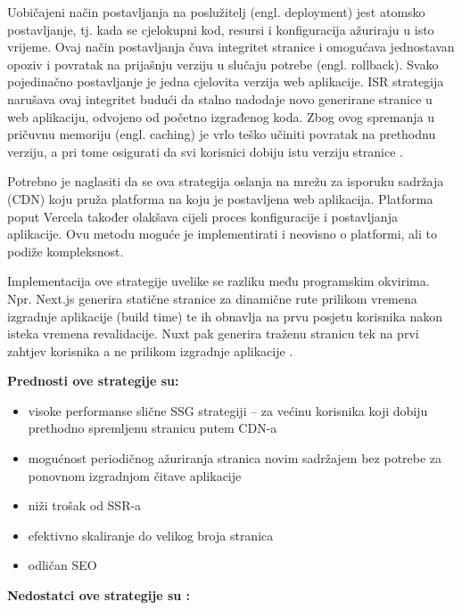 \bigskip

Uobičajeni način postavljanja na poslužitelj (engl. deployment) jest atomsko postavljanje, tj. kada se cjelokupni kod, resursi i konfiguracija ažuriraju u isto vrijeme. Ovaj način postavljanja čuva integritet stranice i omogućava jednostavan opoziv i povratak na prijašnju verziju u slučaju potrebe (engl. rollback). Svako pojedinačno postavljanje je jedna cjelovita verzija web aplikacije. ISR strategija narušava ovaj integritet budući da stalno nadodaje novo generirane stranice u web aplikaciju, odvojeno od početno izgrađenog koda. Zbog ovog spremanja u pričuvnu memoriju (engl. caching)  je vrlo teško učiniti povratak na prethodnu verziju, a pri tome osigurati da svi korisnici dobiju istu verziju stranice \cite{flaws2021isr}.

\bigskip

Potrebno je naglasiti da se ova strategija oslanja na mrežu za isporuku sadržaja (CDN) koju pruža platforma na koju je postavljena web aplikacija. Platforma poput Vercela također olakšava cijeli proces konfiguracije i postavljanja aplikacije. Ovu metodu moguće je implementirati i neovisno o platformi, ali to podiže kompleksnost.

\bigskip

Implementacija ove strategije uvelike se razliku među programskim okvirima.
Npr. Next.js generira statične stranice za dinamične rute prilikom vremena izgradnje aplikacije (build time) te ih obnavlja na prvu posjetu korisnika nakon isteka vremena revalidacije. Nuxt pak generira traženu stranicu tek na prvi zahtjev korisnika a ne prilikom izgradnje aplikacije \cite{troyan2024nuxt}.

\bigskip

\textbf{Prednosti ove strategije su:}
\begin{itemize}
    \item visoke performanse slične SSG strategiji – za većinu korisnika koji dobiju prethodno spremljenu stranicu putem CDN-a
    \item mogućnost periodičnog ažuriranja stranica novim sadržajem bez potrebe za ponovnom izgradnjom čitave aplikacije
    \item niži trošak od SSR-a
    \item efektivno skaliranje do velikog broja stranica
    \item odličan SEO
\end{itemize}

\bigskip

\textbf{Nedostatci ove strategije su \cite{flaws2021isr}:}

